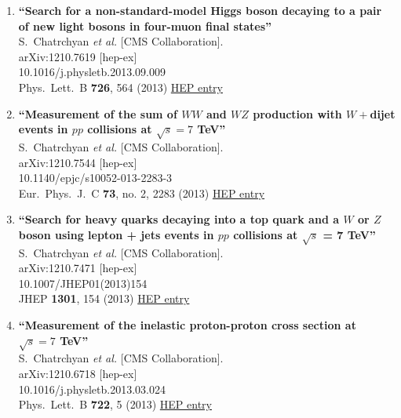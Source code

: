 \documentclass{article}
\begin{document}
\begin{enumerate}
\item%
{\bf ``Search for a non-standard-model Higgs boson decaying to a pair of new light bosons in four-muon final states''}
  \\{}S.~Chatrchyan {\it et al.} [CMS Collaboration].
  \\{}arXiv:1210.7619 [hep-ex]
    \\{}10.1016/j.physletb.2013.09.009
\\{}Phys.\ Lett.\ B {\bf 726}, 564 (2013) %
\href{http://inspirehep.net/record/1193937}{HEP entry}


\item%
{\bf ``Measurement of the sum of $W W$ and $WZ$ production with $W+$dijet events in $pp$ collisions at $\sqrt{s}=7$ TeV''}
  \\{}S.~Chatrchyan {\it et al.} [CMS Collaboration].
  \\{}arXiv:1210.7544 [hep-ex]
    \\{}10.1140/epjc/s10052-013-2283-3
\\{}Eur.\ Phys.\ J.\ C {\bf 73}, no. 2, 2283 (2013) %
\href{http://inspirehep.net/record/1193935}{HEP entry}


\item%
{\bf ``Search for heavy quarks decaying into a top quark and a $W$ or $Z$ boson using lepton + jets events in $pp$ collisions at $\sqrt{s}$ = 7 TeV''}
  \\{}S.~Chatrchyan {\it et al.} [CMS Collaboration].
  \\{}arXiv:1210.7471 [hep-ex]
    \\{}10.1007/JHEP01(2013)154
\\{}JHEP {\bf 1301}, 154 (2013) %
\href{http://inspirehep.net/record/1193934}{HEP entry}


\item%
{\bf ``Measurement of the inelastic proton-proton cross section at $\sqrt{s}=7$ TeV''}
  \\{}S.~Chatrchyan {\it et al.} [CMS Collaboration].
  \\{}arXiv:1210.6718 [hep-ex]
    \\{}10.1016/j.physletb.2013.03.024
\\{}Phys.\ Lett.\ B {\bf 722}, 5 (2013) %
\href{http://inspirehep.net/record/1193338}{HEP entry}



\end{enumerate}
\end{document}
